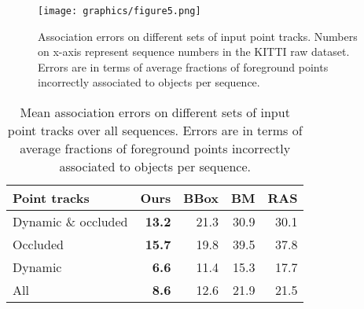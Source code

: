 \begin{figure*}[!!t]
\centering
\texttt{[image: graphics/figure5.png]}
  \vspace{-0.3cm}
  \caption{\small Association errors on different sets of input point tracks. Numbers on x-axis represent sequence numbers in the KITTI raw dataset. Errors are in terms of average fractions of foreground points incorrectly associated to objects per sequence.}
  \vspace{-0.3cm}
  \label{fig:assoc-occ-results}
\end{figure*}

\begin{table}
\begin{tabular}{lrrrr}
  \toprule
  Point tracks & Ours & BBox & BM & RAS\\
  \midrule
  Dynamic \& occluded         & \textbf{13.2} & 21.3 & 30.9 & 30.1 \\
  Occluded		              & \textbf{15.7} & 19.8 & 39.5 & 37.8 \\
  Dynamic		              & \textbf{6.6} & 11.4 & 15.3 & 17.7 \\
  All		                  & \textbf{8.6} & 12.6 & 21.9 & 21.5 \\
  \bottomrule
\end{tabular}
\caption{\small Mean association errors on different sets of input point tracks over all sequences. Errors are in terms of average fractions of foreground points incorrectly associated to objects per sequence.}
\label{tab:meanAssoc}
\end{table}


